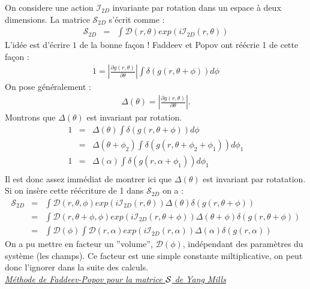 \documentclass[a4paper,11pt]{article}
\theoremstyle{plain}
\theoremstyle{definition}
\theoremstyle{remark}
\numberwithin{equation}{section}
\numberwithin{equation}{subsection}
\numberwithin{figure}{section}
\begin{document}
\noindent
On considere une action $\mathcal{I}_{2D}$ invariante par rotation dans un espace à deux dimensions. La matrice $\mathcal{S}_{2D}$ s'écrit comme :
\begin{eqnarray}
 \mathcal{S}_{2D} &=& \int \mathcal{D}(r,\theta) exp\left(i\mathcal{I}_{2D}(r,\theta)\right) 
\end{eqnarray}
L'idée est d'écrire $1$ de la bonne façon ! Faddeev et Popov ont réécrie 1 de cette façon :
\begin{eqnarray}
 1 = \left| \frac{\partial g(r,\theta)}{\partial \theta} \right| \int \delta \left(g(r,\theta + \phi)\right)d\phi
\end{eqnarray}
On pose généralement :
\begin{eqnarray}
 \Delta(\theta) = \left| \frac{\partial g(r,\theta)}{\partial \theta} \right| .
\end{eqnarray}
Montrons que $\Delta(\theta)$ est invariant par rotation.
\begin{eqnarray}
 1 &=& \Delta(\theta) \int \delta \left(g(r,\theta + \phi)\right)d\phi \\
     &=& \Delta(\theta + \phi_{2}) \int \delta \left(g(r,\theta + \phi_{2} + \phi_{1} )\right)d\phi_{1} \\
 1&=& \Delta(\alpha) \int \delta \left(g(r,\alpha + \phi_{1} )\right)d\phi_{1} \\
\end{eqnarray}
Il est donc assez immédiat de montrer ici que $\Delta ( \theta) $ est invariant par rotatation.
Si on insère cette réécriture de 1  dans $\mathcal{S}_{2D}$ on a :
\begin{eqnarray}
 \mathcal{S}_{2D} &=& \int \mathcal{D}(r,\theta,\phi)
exp\left(i\mathcal{I}_{2D}(r,\theta)\right) 
\Delta(\theta) \delta \left(g(r,\theta + \phi)\right)\\
                 &=& \int \mathcal{D}(r,\theta + \phi, \phi)
exp\left(i\mathcal{I}_{2D}(r,\theta + \phi)\right) 
\Delta(\theta+\phi) \delta \left(g(r,\theta + \phi)\right)\\ 
		 &=& \int \mathcal{D}(\phi) \int \mathcal{D}(r,\alpha)
exp\left(i\mathcal{I}_{2D}(r,\alpha)\right) 
\Delta(\alpha) \delta \left(g(r,\alpha)\right)
\end{eqnarray}
On a pu mettre en facteur un ''volume'', $\mathcal{D}(\phi)$, indépendant des paramètres du système (les champs). Ce facteur est une simple 
constante miltiplicative, on peut donc l'ignorer dans la suite des calculs.\\

\noindent
\textit{\underline{Méthode de Faddeev-Popov pour la matrice $\cal{S}$ de Yang Mills}}\\
\end{document}
